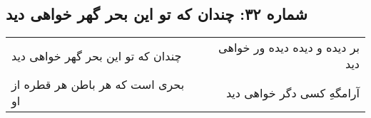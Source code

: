 \begin{center}
\section*{شماره ۳۲: چندان که تو این بحر گهر خواهی دید}
\label{sec:032}
\begin{longtable}{l p{0.5cm} r}
چندان که تو این بحر گهر خواهی دید
&&
بر دیده و دیده دیده ور خواهی دید
\\
بحری است که هر باطن هر قطره از او
&&
آرامگهِ کسی دگر خواهی دید
\\
\end{longtable}
\end{center}
